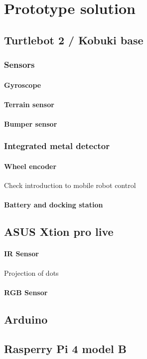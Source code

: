 \chapter{Prototype solution}

\section{Turtlebot 2 / Kobuki base}

\subsection{Sensors}

\subsubsection*{Gyroscope}

\subsubsection*{Terrain sensor}

\subsubsection*{Bumper sensor}

\subsection{Integrated metal detector}

\subsubsection*{Wheel encoder}
Check introduction to mobile robot control

\subsubsection*{Battery and docking station}

\section*{ASUS Xtion pro live}

\subsubsection*{IR Sensor}
Projection of dots

\subsubsection*{RGB Sensor}

\section{Arduino}

\section{Rasperry Pi 4 model B}




